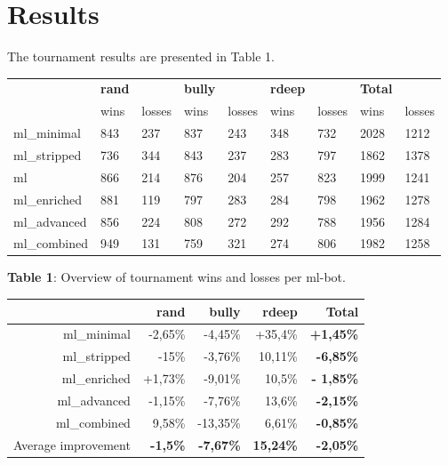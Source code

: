 \documentclass[a4paper,11pt]{article}
\begin{document}
\section{Results}
The tournament results are presented in Table 1. 

\begin{center}
  \begin{tabular}{ | l | l l | l l | l l | | l l | }
     \hline
      & \textbf{rand} & & \textbf{bully} & & \textbf{rdeep} & & \textbf{Total} & \\
      & wins & losses & wins & losses & wins & losses  & wins & losses\\ \hline
      ml\_minimal & 843 & 237 & 837 & 243 & 348 & 732 & 2028 & 1212 \\ \hline
      ml\_stripped & 736 & 344 & 843 & 237 & 283 & 797 & 1862 & 1378  \\ \hline
      ml & 866 & 214 & 876 & 204 & 257 & 823 & 1999 & 1241 \\ \hline
      ml\_enriched & 881 & 119 & 797 & 283 & 284 & 798 & 1962 & 1278 \\ \hline
      ml\_advanced  & 856 & 224 & 808 & 272 & 292 & 788 & 1956 & 1284 \\ \hline
      ml\_combined & 949 & 131 & 759 & 321 & 274 & 806 & 1982 & 1258 \\ \hline
  \end{tabular}
\end{center}
 
\textbf{Table 1}: Overview of tournament wins and losses per ml-bot. \\

\begin{center}
\begin{tabular}{| r | r | r | r || r |}
\hline
      & \textbf{rand} & \textbf{bully} & \textbf{rdeep} & \textbf{Total} \\ \hline
      ml\_minimal & -2,65\% & -4,45\% & +35,4\% & \textbf{+1,45\%}   \\ \hline
      ml\_stripped & -15\% & -3,76\% & 10,11\% & \textbf{-6,85\%}  \\ \hline
      ml\_enriched & +1,73\% & -9,01\% & 10,5\% & \textbf{- 1,85\%} \\ \hline
      ml\_advanced & -1,15\% & -7,76\% & 13,6\%& \textbf{-2,15\%}  \\ \hline
      ml\_combined & 9,58\% & -13,35\% & 6,61\% & \textbf{-0,85\%}  \\ \hline \hline
      Average improvement & \textbf{-1,5\%} & \textbf{-7,67\%} & \textbf{15,24\%} & \textbf{-2,05\%} \\ \hline
\end{tabular} \\
\end{center}
\end{document}
